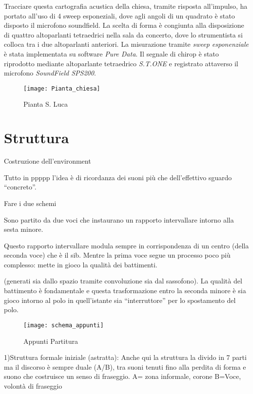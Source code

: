 Tracciare questa cartografia acustica della chiesa, tramite risposta all'impulso,
ha portato all'uso di 4 sweep esponeziali, dove agli angoli di un quadrato è
stato disposto il microfono soundfield. La scelta di forma è congiunta alla
disposizione di quattro altoparlanti tetraedrici nella sala da concerto, dove
lo strumentista si colloca tra i due altoparlanti anteriori.
La misurazione  tramite \emph{sweep esponenziale} è stata implementata su software
\emph{Pure Data}. Il segnale di chirop è stato riprodotto mediante altoparlante
tetraedrico \emph{S.T.ONE} e registrato attaverso il microfono \emph{SoundField SPS200}.

\begin{figure}
\centering
{\texttt{[image: Pianta\_chiesa]}}
\caption[Pianta S. Luca]{Pianta S. Luca}
\label{fig:tetratetra}
\end{figure}

\section*{Struttura}
\label{sec:struttura}

Costruzione dell'environment


Tutto in ppppp l'idea  è di ricordanza dei suoni più che dell'effettivo sguardo “concreto”.

Fare i due schemi

Sono partito da due voci che instaurano un rapporto intervallare intorno alla sesta minore.

Questo rapporto intervallare modula sempre in corrispondenza di un centro
(della seconda voce) che è il sib. Mentre  la prima voce segue un processo poco
più complesso: mette in gioco la qualità dei battimenti.

(generati sia dallo spazio tramite convoluzione sia dal sassofono).
La qualità del battimento è fondamentale e questa trasformazione entro la seconda
minore è sia gioco intorno al polo in quell'istante sia “interruttore” per
lo spostamento del polo.

\begin{figure}
\centering
{\texttt{[image: schema\_appunti]}}
\caption[Appunti Partitura]{Appunti Partitura}
\label{fig:tetratetra}
\end{figure}

1)Struttura formale iniziale (astratta):
Anche qui la struttura la divido in 7 parti ma il discorso è sempre duale (A/B),
tra suoni tenuti fino alla perdita di forma e suono che costruisce un senso di fraseggio.
A= zona informale, corone
B=Voce, volontà di fraseggio

